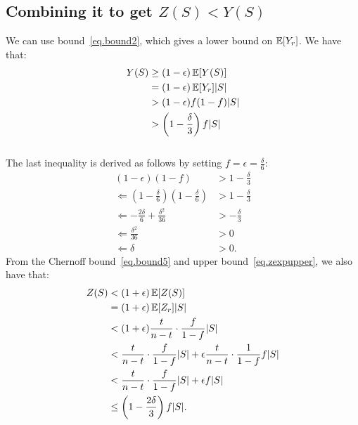 
\subsection{Combining it to get $Z(S) < Y(S)$}
We can use bound~\ref{eq.bound2}, which gives a lower bound on $\mathbb{E}[Y_r]$.
We have that:
\begin{align}
Y(S) & \geq (1-\epsilon)\operatorname{\mathbb{E}}[Y(S)] \\
& = (1-\epsilon)\operatorname{\mathbb{E}}[Y_r] |S| \\
&> (1-\epsilon)f(1-f)|S|\\
&>  \left(1 - \frac{\delta}{3}\right)f|S| \label{eq.ylower}
\end{align}\\
The last inequality is derived as follows by setting $f = \epsilon = \frac{\delta}{6}$:
\begin{align}
 (1-\epsilon)(1-f) &> 1 - \frac{\delta}{3}\\
 \Leftarrow \left(1-\frac{\delta}{6}\right)\left(1-\frac{\delta}{6}\right) &> 1-\frac{\delta}{3}\\
 \Leftarrow -\frac{2\delta}{6} + \frac{\delta^2}{36} &> -\frac{\delta}{3}\\
 \Leftarrow \frac{\delta^2}{36} &> 0\\
 \Leftarrow \delta &> 0.
\end{align}
From the Chernoff bound~\ref{eq.bound5} and upper bound~\ref{eq.zexpupper}, we also have that:
\begin{align}
Z(S) &< (1+\epsilon)\operatorname{\mathbb{E}}[Z(S)]\\
&=(1+\epsilon)\operatorname{\mathbb{E}}[Z_r]|S|\\
&<(1+\epsilon)\frac{t}{n-t} \cdot \frac{f}{1-f} |S|\\
&<\frac{t}{n-t} \cdot \frac{f}{1-f} |S|+\epsilon\frac{t}{n-t} \cdot \frac{1}{1-f} f|S|\\
&< \frac{t}{n-t} \cdot \frac{f}{1-f} |S| + \epsilon f|S|\label{eq.balance}\\
&\leq \left(1 - \frac{2\delta}{3}\right)f|S|\label{eq.zupper}.
\end{align}\\

